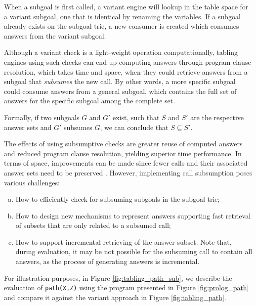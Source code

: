 When a subgoal is first called, a variant engine will lookup in the table space for a variant subgoal, one that is
identical by renaming the variables. If a subgoal already exists on the subgoal trie, a new consumer is created which
consumes answers from the variant subgoal.

Although a variant check is a light-weight operation computationally,
tabling engines using such checks can end up computing answers through program clause resolution, which takes time and space,
when they could retrieve answers from a subgoal that \textit{subsumes} the new call. By other words, a more specific subgoal
could consume answers from a general subgoal, which contains the full set of answers for the specific subgoal among the complete set.

Formally, if two subgoals $G$ and $G'$ exist, such that $S$ and $S'$ are the respective answer sets and
$G'$ subsumes $G$, we can conclude that $S \subseteq S'$.

The effects of using subsumptive checks are greater reuse of computed answers and reduced program clause resolution, yielding
superior time performance. In terms of space, improvements can be made since fewer calls and their associated answer sets
need to be preserved \cite{Johnson-99}.
However, implementing call subsumption poses various challenges:

\begin{enumerate}[(a)]
\item How to efficiently check for subsuming subgoals in the subgoal trie;
\item How to design new mechanisms to represent answers supporting fast retrieval of subsets that are only related to a subsumed call;
\item How to support incremental retrieving of the answer subset. Note that, during evaluation, it may be not possible for
the subsuming call to contain all answers, as the process of generating answers is incremental.
\end{enumerate}

For illustration purposes, in Figure \ref{fig:tabling_path_sub}, we describe the evaluation of \texttt{path(X,Z)}
using the program presented in Figure \ref{fig:prolog_path}
and compare it against the variant approach in Figure \ref{fig:tabling_path}.


